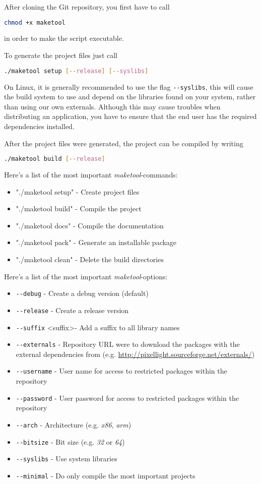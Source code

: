 After cloning the Git repository, you first have to call
\begin{lstlisting}[language=bash]
chmod +x maketool
\end{lstlisting}
in order to make the script executable.

To generate the project files just call
\begin{lstlisting}[language=bash]
./maketool setup [--release] [--syslibs]
\end{lstlisting}

On Linux, it is generally recommended to use the flag \verb+--syslibs+, this will cause the build system to use and depend on the libraries found on your system, rather than using our own externals. Although this may cause troubles when distributing an application, you have to ensure that the end user has the required dependencies installed.

After the project files were generated, the project can be compiled by writing
\begin{lstlisting}[language=bash]
./maketool build [--release]
\end{lstlisting}

Here's a list of the most important \emph{maketool}-commands:
\begin{itemize}
\item{"./maketool setup"	- Create project files}
\item{"./maketool build"	- Compile the project}
\item{"./maketool docs"		- Compile the documentation}
\item{"./maketool pack"		- Generate an installable package}
\item{"./maketool clean"	- Delete the build directories}
\end{itemize}

Here's a list of the most important \emph{maketool}-options:
\begin{itemize}
\item{\verb+--debug+								- Create a debug version (default)}
\item{\verb+--release+								- Create a release version}
\item{\verb+--suffix+ \textless suffix\textgreater	- Add a suffix to all library names}
\item{\verb+--externals+							- Repository URL were to download the packages with the external dependencies from (e.g. \url{http://pixellight.sourceforge.net/externals/})}
\item{\verb+--username+								- User name for access to restricted packages within the repository}
\item{\verb+--password+								- User password for access to restricted packages within the repository}
\item{\verb+--arch+									- Architecture (e.g. \emph{x86}, \emph{arm})}
\item{\verb+--bitsize+								- Bit size (e.g. \emph{32} or \emph{64})}
\item{\verb+--syslibs+								- Use system libraries}
\item{\verb+--minimal+								- Do only compile the most important projects}
\end{itemize}

